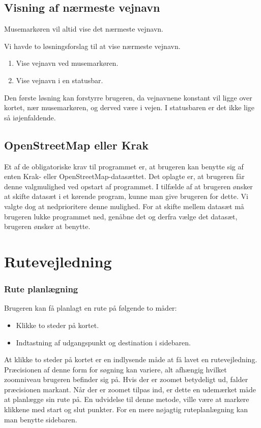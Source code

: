 \subsection{Visning af nærmeste vejnavn}

Musemarkøren vil altid vise det nærmeste vejnavn.

Vi havde to løsningsforslag til at vise nærmeste vejnavn. 

\begin{enumerate}
   \item Vise vejnavn ved musemarkøren.
   \item Vise vejnavn i en statusbar.
\end{enumerate}

Den første løsning kan forstyrre brugeren, da vejnavnene konstant vil ligge over kortet, nær musemarkøren, og derved være i vejen. I statusbaren er det ikke lige så iøjenfaldende. 
	
\subsection{OpenStreetMap eller Krak}
Et af de obligatoriske krav til programmet er, at brugeren kan benytte sig af enten Krak- eller OpenStreetMap-datasættet. Det oplagte er, at brugeren får denne valgmulighed ved opstart af programmet. I tilfælde af at brugeren ønsker at skifte datasæt i et kørende program, kunne man give brugeren for dette. Vi valgte dog at nedprioritere denne mulighed. For at skifte mellem datasæt må brugeren lukke programmet ned, genåbne det og derfra vælge det datasæt, brugeren ønsker at benytte. 


\section{Rutevejledning}

\subsubsection{Rute planlægning}

Brugeren kan få planlagt en rute på følgende to måder:

\begin{itemize}
	\item Klikke to steder på kortet.
	\item  Indtastning af udgangspunkt og destination i sidebaren.
\end{itemize}

At klikke to steder på kortet er en indlysende måde at få lavet en rutevejledning. Præcisionen af denne form for søgning kan variere, alt afhængig hvilket zoomniveau brugeren befinder sig på. Hvis der er zoomet betydeligt ud, falder præcisionen markant. Når der er zoomet tilpas ind, er dette en udemærket måde at planlægge sin rute på. En udvidelse til denne metode, ville være at markere klikkene med start og slut punkter. For en mere nøjagtig ruteplanlægning kan man benytte sidebaren.

